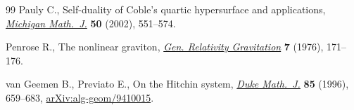 \begin{thebibliography}{99}
Pauly C., Self-duality of {C}oble's quartic hypersurface and applications,
 \href{https://doi.org/10.1307/mmj/1039029982}{\textit{Michigan Math.~J.}} \textbf{50} (2002), 551--574.

Penrose R., The nonlinear graviton, \href{https://doi.org/10.1007/bf00763433}{\textit{Gen. Relativity Gravitation}}
 \textbf{7} (1976), 171--176.

van Geemen B., Previato E., On the {H}itchin system, \href{https://doi.org/10.1215/S0012-7094-96-08525-7}{\textit{Duke Math.~J.}}
 \textbf{85} (1996), 659--683, \href{https://arxiv.org/abs/alg-geom/9410015}{arXiv:alg-geom/9410015}.

\end{thebibliography}
